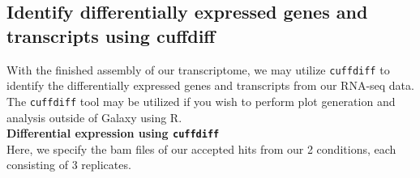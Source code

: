 \documentclass[a4paper,10pt]{article}
\begin{document}
\subsection{Identify differentially expressed genes and transcripts using cuffdiff}
With the finished assembly of our transcriptome, we may utilize \texttt{\footnotesize{cuffdiff}} to identify the differentially expressed genes and transcripts from our RNA-seq data.  The \texttt{\footnotesize{cuffdiff}} tool may be utilized if you wish to perform plot generation and analysis outside of Galaxy using R.\vspace{1em}\\
\textbf{Differential expression using \texttt{\footnotesize{cuffdiff}}}\vspace{1em}\\
\setlength\fboxsep{0pt}\vspace{1em}
Here, we specify the bam files of our accepted hits from our 2 conditions, each consisting of 3 replicates.\vspace{1em}\\
\end{document}
